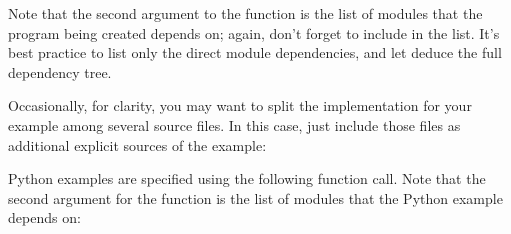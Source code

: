 \documentclass[letterpaper,10pt,english]{sphinxmanual}
\renewcommand{\sphinxcode}[1]{\texttt{\small{#1}}}
\begin{document}
\begin{sphinxVerbatim}[commandchars=\\\{\}]
 
    
                               \PYG{p}{[} \PYG{p}{]}
    
\end{sphinxVerbatim}

Note that the second argument to the function \sphinxcode{}
is the list of modules that the program being created depends on; again,
don’t forget to include \sphinxcode{} in the list.  It’s best practice
to list only the direct module dependencies, and let \sphinxcode{} deduce
the full dependency tree.

Occasionally, for clarity, you may want to split the implementation
for your example among several source files.  In this case, just
include those files as additional explicit sources of the example:

\begin{sphinxVerbatim}[commandchars=\\\{\}]
   \PYG{p}{[}\PYG{p}{]}
  \PYG{p}{[} \PYG{p}{]}
\end{sphinxVerbatim}

Python examples are specified using the following
function call.  Note that the second argument for the function
\sphinxcode{} is the list of modules that the Python example
depends on:
\end{document}
